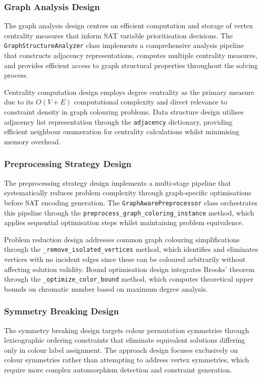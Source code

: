 \subsubsection{Graph Analysis Design}

The graph analysis design centres on efficient computation and storage of vertex centrality measures that inform SAT variable prioritisation decisions. The \texttt{GraphStructure\-Analyzer} class implements a comprehensive analysis pipeline that constructs adjacency representations, computes multiple centrality measures, and provides efficient access to graph structural properties throughout the solving process.

Centrality computation design employs degree centrality as the primary measure due to its $O(V+E)$ computational complexity and direct relevance to constraint density in graph colouring problems. Data structure design utilises adjacency list representation through the \texttt{adjacency} dictionary, providing efficient neighbour enumeration for centrality calculations whilst minimising memory overhead.

\subsubsection{Preprocessing Strategy Design}

The preprocessing strategy design implements a multi-stage pipeline that systematically reduces problem complexity through graph-specific optimisations before SAT encoding generation. The \texttt{GraphAwarePreprocessor} class orchestrates this pipeline through the \texttt{preprocess\_graph\_coloring\_instance} method, which applies sequential optimisation steps whilst maintaining problem equivalence.

Problem reduction design addresses common graph colouring simplifications through the \texttt{\_remove\_isolated\_vertices} method, which identifies and eliminates vertices with no incident edges since these can be coloured arbitrarily without affecting solution validity. Bound optimisation design integrates Brooks' theorem through the \texttt{\_optimize\_\-color\_\-bound} method, which computes theoretical upper bounds on chromatic number based on maximum degree analysis.

\subsubsection{Symmetry Breaking Design}

The symmetry breaking design targets colour permutation symmetries through lexicographic ordering constraints that eliminate equivalent solutions differing only in colour label assignment. The approach design focuses exclusively on colour symmetries rather than attempting to address vertex symmetries, which require more complex automorphism detection and constraint generation.

